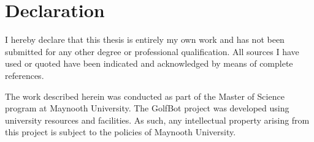 \chapter*{Declaration}
\label{chap:declaration}

I hereby declare that this thesis is entirely my own work and has not been submitted for any other degree or professional qualification. All sources I have used or quoted have been indicated and acknowledged by means of complete references.

The work described herein was conducted as part of the Master of Science program at Maynooth University. The GolfBot project was developed using university resources and facilities. As such, any intellectual property arising from this project is subject to the policies of Maynooth University.
